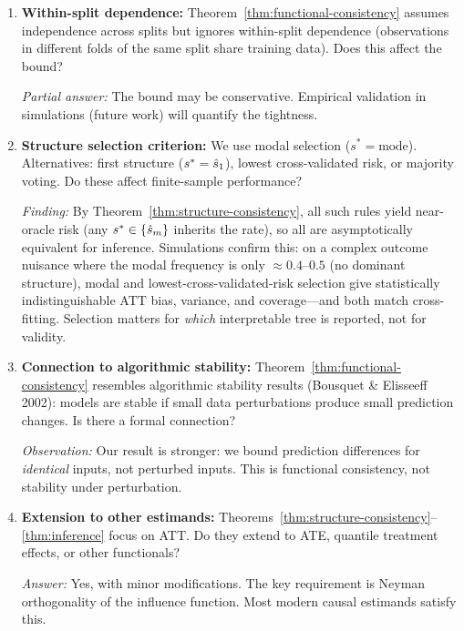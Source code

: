 \documentclass[12pt]{article}
\begin{document}
\begin{enumerate}
\item \textbf{Within-split dependence:} Theorem~\ref{thm:functional-consistency} assumes independence across splits but ignores within-split dependence (observations in different folds of the same split share training data). Does this affect the bound?

\textit{Partial answer:} The bound may be conservative. Empirical validation in simulations (future work) will quantify the tightness.

\item \textbf{Structure selection criterion:} We use modal selection ($s^* = \text{mode}$). Alternatives: first structure ($s^* = \hat{s}_1$), lowest cross-validated risk, or majority voting. Do these affect finite-sample performance?

\textit{Finding:} By Theorem~\ref{thm:structure-consistency}, all such rules yield near-oracle risk (any $s^*\in\{\hat{s}_m\}$ inherits the rate), so all are asymptotically equivalent for inference. Simulations confirm this: on a complex outcome nuisance where the modal frequency is only $\approx 0.4$--$0.5$ (no dominant structure), modal and lowest-cross-validated-risk selection give statistically indistinguishable ATT bias, variance, and coverage---and both match cross-fitting. Selection matters for \emph{which} interpretable tree is reported, not for validity.

\item \textbf{Connection to algorithmic stability:} Theorem~\ref{thm:functional-consistency} resembles algorithmic stability results (Bousquet \& Elisseeff 2002): models are stable if small data perturbations produce small prediction changes. Is there a formal connection?

\textit{Observation:} Our result is stronger: we bound prediction differences for \emph{identical} inputs, not perturbed inputs. This is functional consistency, not stability under perturbation.

\item \textbf{Extension to other estimands:} Theorems~\ref{thm:structure-consistency}--\ref{thm:inference} focus on ATT. Do they extend to ATE, quantile treatment effects, or other functionals?

\textit{Answer:} Yes, with minor modifications. The key requirement is Neyman orthogonality of the influence function. Most modern causal estimands satisfy this.
\end{enumerate}
\end{document}
